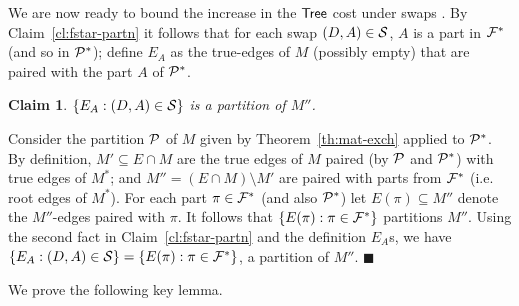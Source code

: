 \documentclass[11pt,twoside,a4paper]{article}
\newtheorem{claim}[theorem]{Claim}
\newenvironment{proof}{

\noindent{\bf Proof:}} {\hfill$\blacksquare$


}
\newcommand{\sse}{\subseteq}
\begin{document}
\medskip
We are now ready to bound the increase in the ${\sf Tree}$ cost under swaps \swap. By Claim~\ref{cl:fstar-partn} it follows
that for each swap $(D,A)\in \mathcal{S}$, $A$ is a part in $\mathcal{F}^*$ (and so in $\mathcal{P}^*$); define $E_A$ as the true-edges of $M$
(possibly empty) that are paired with the part $A$ of $\mathcal{P}^*$.

\begin{claim}\label{cl:kmf-Ea} $\{E_A : (D,A)\in \mathcal{S}\}$ is a partition of $M''$.\end{claim}
\begin{proof}
Consider the partition $\mathcal{P}$ of $M$ given by Theorem~\ref{th:mat-exch} applied to $\mathcal{P}^*$. By definition, $M'\sse E\cap
M$ are the true edges of $M$ paired (by $\mathcal{P}$ and $\mathcal{P}^*$) with true edges of $M^*$; and $M''=(E\cap M)\setminus M'$ are
paired with parts from $\mathcal{F}^*$ (i.e. root edges of $M^*$). For each part $\pi\in \mathcal{F}^*$ (and also $\mathcal{P}^*$) let $E(\pi)\sse
M''$ denote the $M''$-edges paired with $\pi$. It follows that $\{E(\pi) : \pi\in \mathcal{F}^*\}$ partitions $M''$. Using the
second fact in Claim~\ref{cl:fstar-partn} and the definition $E_A$s, we have $\{E_A : (D,A)\in \mathcal{S}\} = \{E(\pi) :
\pi\in \mathcal{F}^*\}$, a partition of $M''$.
\end{proof}

We prove the following key lemma.
\end{document}
